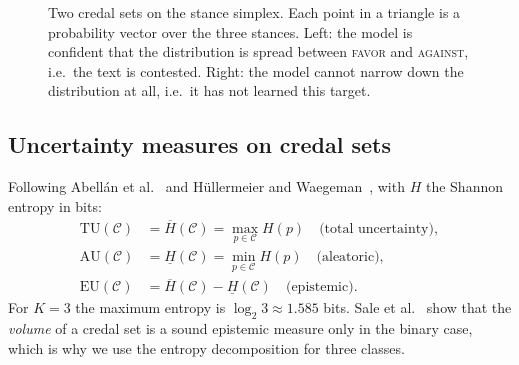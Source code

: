 \documentclass[11pt,a4paper]{article}
\newcommand{\lo}[1]{\underline{#1}}
\newcommand{\up}[1]{\overline{#1}}
\newcommand{\credal}{\mathcal{C}}
\newcommand{\TU}{\mathrm{TU}}
\newcommand{\AU}{\mathrm{AU}}
\newcommand{\EU}{\mathrm{EU}}
\begin{document}
\begin{figure}[t]
\centering
{}
\caption{Two credal sets on the stance simplex. Each point in a triangle is a probability
vector over the three stances. Left: the model is confident that the distribution is spread
between \textsc{favor} and \textsc{against}, i.e.\ the text is contested. Right: the model
cannot narrow down the distribution at all, i.e.\ it has not learned this target.}
\label{fig:simplex}
\end{figure}

\subsection{Uncertainty measures on credal sets}

Following Abell\'an et al.~\cite{abellan2006} and H\"ullermeier and
Waegeman~\cite{hullermeier2021}, with $H$ the Shannon entropy in bits:
\begin{align}
  \TU(\credal) &= \up{H}(\credal) = \max_{p \in \credal} H(p) \quad\text{(total uncertainty)},\\
  \AU(\credal) &= \lo{H}(\credal) = \min_{p \in \credal} H(p) \quad\text{(aleatoric)},\\
  \EU(\credal) &= \up{H}(\credal) - \lo{H}(\credal) \quad\text{(epistemic)}.
\end{align}
For $K=3$ the maximum entropy is $\log_2 3 \approx 1.585$ bits. Sale et
al.~\cite{sale2023} show that the \emph{volume} of a credal set is a sound epistemic measure
only in the binary case, which is why we use the entropy decomposition for three classes.
\end{document}
